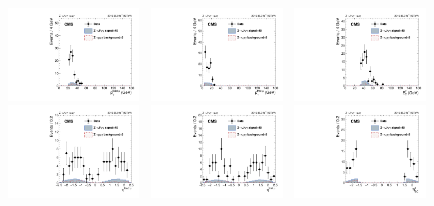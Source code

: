 		\begin{figure}[h]
		  \centering
		  \includegraphics[width=0.31\textwidth]{Fig/Final_NoPreliminary/ZJpsiG/leadingMuonPt_EE}~
		  \includegraphics[width=0.31\textwidth]{Fig/Final_NoPreliminary/ZJpsiG/trailingMuonPt_EE}~
		  \includegraphics[width=0.31\textwidth]{Fig/Final_NoPreliminary/ZJpsiG/phoPt_EE}\\
		  \includegraphics[width=0.31\textwidth]{Fig/Final_NoPreliminary/ZJpsiG/leadingMuonEta_EE}~
		  \includegraphics[width=0.31\textwidth]{Fig/Final_NoPreliminary/ZJpsiG/trailingMuonEta_EE}~
		  \includegraphics[width=0.31\textwidth]{Fig/Final_NoPreliminary/ZJpsiG/phoSCEta_EE}\\

\end{figure}
